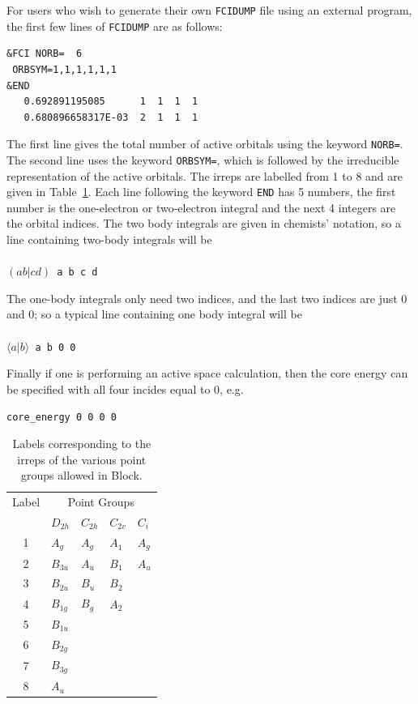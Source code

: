 \documentclass[letterpaper,12pt,aps, pra]{revtex4-1}
\begin{document}
For users who wish to generate their own \texttt{FCIDUMP} file using an external program, the first few lines of \texttt{FCIDUMP} are as follows:
\begin{verbatim}
&FCI NORB=  6
 ORBSYM=1,1,1,1,1,1
&END
   0.692891195085      1  1  1  1
   0.680896658317E-03  2  1  1  1
\end{verbatim}
The first line gives the total number of active orbitals using the keyword \texttt{NORB=}. The second line uses the keyword \texttt{ORBSYM=}, which is followed by the irreducible representation of the active orbitals. The irreps are labelled from 1 to 8 and are given in Table~\ref{tab:irrep}.
Each line following the keyword \texttt{END} has 5 numbers, the first number is the one-electron or two-electron integral and the next 4 integers are the orbital indices. The two body integrals are given in chemists' notation, so a line containing two-body integrals will be\\
\texttt{
\\$( a b|cd)$ a b c d\\}
 
The one-body integrals only need two indices, and the last two indices are just 0 and 0; so a typical line containing one body integral will be\\
\texttt{
\\$\langle a|b\rangle$ a b 0 0\\}

Finally if one is performing an active space calculation, then the core energy can be specified with all four incides equal to 0, e.g.
\begin{verbatim}
core_energy 0 0 0 0
\end{verbatim}

\begin{table}\label{tab:irrep}
\begin{center}
\caption{Labels corresponding to the irreps of the various point groups allowed in Block.}
 \begin{tabular}{cllll}
 \hline
\hline
Label & \multicolumn{4}{c}{Point Groups}\\
&$D_{2h}$&$C_{2h}$&$C_{2v}$&$C_i$\\
\hline
1&$A_g$&$A_g$&$A_1$&$A_g$\\
2&$B_{3u}$&$A_u$&$B_1$&$A_u$\\
3&$B_{2u}$&$B_u$&$B_2$&\\
4&$B_{1g}$&$B_g$&$A_2$&\\
5&$B_{1u}$&&&\\
6&$B_{2g}$&&&\\
7&$B_{3g}$&&&\\
8&$A_u$&&&\\
\hline
\hline
 \end{tabular}
\end{center}
\end{table}
\end{document}
